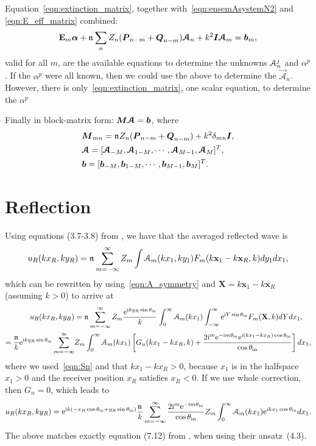 \documentclass[12pt, a4paper]{article}
\begin{document}
Equation~\eqref{eqn:extinction_matrix}, together with~\eqref{eqn:ensemAsystemN2} and \eqref{eqn:E_eff_matrix} combined:
\begin{align}
  \mathbf E_{m} \boldsymbol{\alpha}
+ \mathfrak n_{} \sum_{n}  Z_n ( \boldsymbol{P}_{n-m} + \boldsymbol{Q}_{n-m}) \boldsymbol{\mathcal A}_n
+  k^2 \boldsymbol{I} \boldsymbol{\mathcal A}_m  =  \boldsymbol{b}_m,
\end{align}
 valid for all $m$, are the available equations to determine the unknowns $\mathcal A_n^j$ and $\alpha^p$. If the $\alpha^p$ were all known, then we could use the above to determine the $\vec {\mathcal A}_n$. However, there is only~\eqref{eqn:extinction_matrix}, one scalar equation, to determine the $\alpha^p$



Finally in block-matrix form: $\boldsymbol{M} \boldsymbol{\mathcal A}  =  \boldsymbol{b}$, where
\begin{align}
&\boldsymbol{M}_{mn} = \mathfrak n_{} Z_n ( \boldsymbol{P}_{n-m} + \boldsymbol{Q}_{n-m})+  k^2 \delta_{mn} \boldsymbol{I},
\\
& \boldsymbol{\mathcal A} = [ \boldsymbol{\mathcal A}_{-M}, \boldsymbol{\mathcal A}_{1-M}, \cdots, \boldsymbol{\mathcal A}_{M-1}, \boldsymbol{\mathcal A}_{M}]^T,
\\
& \boldsymbol{b} = [ \boldsymbol{b}_{-M}, \boldsymbol{b}_{1-M}, \cdots, \boldsymbol{b}_{M-1}, \boldsymbol{b}_{M}]^T.
  \label{eqn:ensemAsystemB}
\end{align}

\section{Reflection}

Using equations (3.7-3.8) from \cite{gower_reflection_2018}, we have that the averaged reflected wave is
\begin{equation}
  u_R(kx_R,ky_R) = \mathfrak n_{} \sum_{m=-\infty}^\infty Z_m \int \mathcal A_m(kx_1,ky_1) F_m(k\mathbf x_1 - k\mathbf x_R,k) dy_1 dx_1,
\end{equation}
which can be rewritten by using~\eqref{eqn:A_symmetry} and $\mathbf X = k\mathbf x_1 - k\mathbf x_R$ (assuming $k>0$) to arrive at
\begin{align}
  u_R(kx_R,ky_R) &= \mathfrak n_{} \sum_{m=-\infty}^\infty Z_m \frac{\textrm{e}^{ \textrm{i} k y_R \sin \theta_{\mathrm{in}}}}{k} \int_{0}^\infty \mathcal A_m(kx_1) \int_{-\infty}^\infty \textrm{e}^{ \textrm{i} Y \sin \theta_{\mathrm{in}}} F_m(\mathbf X,k) dY dx_1,
  \\ \notag
   =  \frac{\mathfrak n_{}}{k} \textrm{e}^{ \textrm{i} k y_R \sin \theta_{\mathrm{in}}} \sum_{m=-\infty}^\infty &Z_m \int_{0}^\infty \mathcal A_m(kx_1) \left [ G_n(kx_1 - k x_R, k) + \frac{2 \textrm{i}^m \textrm{e}^{-\textrm{i} m \theta_{\mathrm{in}}} \textrm{e}^{\textrm{i} (kx_1 - k x_R) \cos \theta_{\mathrm{in}}}}{\cos \theta_{\mathrm{in}}} \right] d x_1,
\end{align}
where we used~\eqref{eqn:Sn} and that $kx_1 - k x_R > 0$, because $x_1$ is in the halfspace $x_1 >0$ and the receiver position $x_R$ satisfies $x_R<0$. If we use whole correction, then $G_n = 0$, which leads to
\begin{equation}
  u_R(kx_R,ky_R) =   \textrm{e}^{ \textrm{i} k ( - x_R \cos \theta_{\mathrm{in}} + y_R \sin \theta_{\mathrm{in}} )} \frac{\mathfrak n_{}}{k} \sum_{m=-\infty}^\infty \frac{2 \textrm{i}^m \textrm{e}^{-\textrm{i} m \theta_{\mathrm{in}}}}{\cos \theta_{\mathrm{in}}} Z_m  \int_{0}^\infty \mathcal A_m(kx_1) \textrm{e}^{\textrm{i} k x_1 \cos \theta_{\mathrm{in}}}  d x_1.
\end{equation}
The above matches exactly equation (7.12) from \cite{gower_reflection_2018}, when using their ansatz~(4.3).
\end{document}
